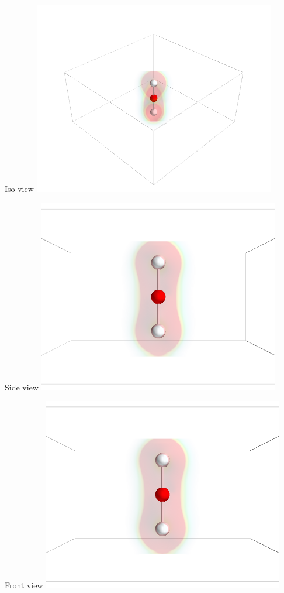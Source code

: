 \documentclass[11pt]{article}
\begin{document}
\begin{itemize}
Iso view
\includegraphics[width=.9\linewidth]{./images/co2-diffsize_iso.png}

Side view
\includegraphics[width=.9\linewidth]{./images/co2-diffsize_side.png}

Front view
\includegraphics[width=.9\linewidth]{./images/co2-diffsize_front.png}



\end{itemize} %
\end{document}
